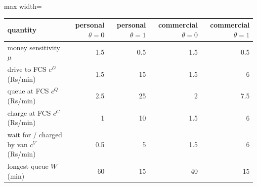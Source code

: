 \small
\begin{adjustbox}{max width=\linewidth}
\begin{tabular}{@{}lrrrr@{}}
\toprule
quantity & personal $\theta=0$ & personal $\theta=1$ & commercial $\theta=0$ & commercial $\theta=1$ \\
\midrule
money sensitivity $\mu$ & 1.5 & 0.5 & 1.5 & 0.5 \\
drive to FCS $c^{D}$ (Rs/min) & 1.5 & 15 & 1.5 & 6 \\
queue at FCS $c^{Q}$ (Rs/min) & 2.5 & 25 & 2 & 7.5 \\
charge at FCS $c^{C}$ (Rs/min) & 1 & 10 & 1.5 & 6 \\
wait for / charged by van $c^{V}$ (Rs/min) & 0.5 & 5 & 1.5 & 6 \\
longest queue $W$ (min) & 60 & 15 & 40 & 15 \\
\bottomrule
\end{tabular}
\end{adjustbox}

